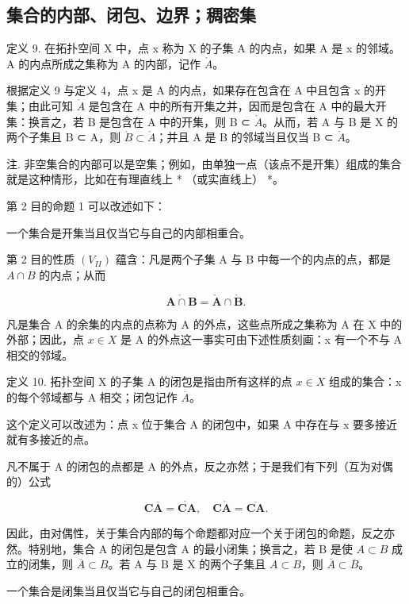 \subsection{集合的内部、闭包、边界；稠密集}

定义 9. 在拓扑空间 X 中，点 x 称为 X 的子集 A 的内点，如果 A 是 x 的邻域。A 的内点所成之集称为 A 的内部，记作 \(\mathring{A}\)。

根据定义 9 与定义 4，点 x 是 A 的内点，如果存在包含在 A 中且包含 x 的开集；由此可知 \(\mathring{A}\) 是包含在 A 中的所有开集之并，因而是包含在 A 中的最大开集：换言之，若 B 是包含在 A 中的开集，则 B ⊂ \(\mathring{A}\)。从而，若 A 与 B 是 X 的两个子集且 B ⊂ A，则 \(\mathring{B} \subset \mathring{A}\)；并且 A 是 B 的邻域当且仅当 B ⊂ \(\mathring{A}\)。

注. 非空集合的内部可以是空集；例如，由单独一点（该点不是开集）组成的集合就是这种情形，比如在有理直线上 * （或实直线上） *。

第 2 目的命题 1 可以改述如下：

一个集合是开集当且仅当它与自己的内部相重合。

第 2 目的性质 \((V_{II})\) 蕴含：凡是两个子集 A 与 B 中每一个的内点的点，都是 \(A \cap B\) 的内点；从而

\[
\mathring {\mathbf {A} \cap \mathbf {B}} = \mathring {\mathbf {A}} \cap \mathring {\mathbf {B}}.\tag{1}
\]

凡是集合 A 的余集的内点的点称为 A 的外点，这些点所成之集称为 A 在 X 中的外部；因此，点 \(x \in X\) 是 A 的外点这一事实可由下述性质刻画：x 有一个不与 A 相交的邻域。

定义 10. 拓扑空间 X 的子集 A 的闭包是指由所有这样的点 \(x \in X\) 组成的集合：x 的每个邻域都与 A 相交；闭包记作 \(\overline{A}\)。

这个定义可以改述为：点 x 位于集合 A 的闭包中，如果 A 中存在与 x 要多接近就有多接近的点。

凡不属于 A 的闭包的点都是 A 的外点，反之亦然；于是我们有下列（互为对偶的）公式

\[
\mathbf {C} \overline {{\mathbf {A}}} = \mathring {\mathbf {C} \mathbf {A}}, \quad \mathbf {C} \mathring {\mathbf {A}} = \overline {{\mathbf {C} \mathbf {A}}}.\tag{2}
\]

因此，由对偶性，关于集合内部的每个命题都对应一个关于闭包的命题，反之亦然。特别地，集合 A 的闭包是包含 A 的最小闭集；换言之，若 B 是使 \(A \subset B\) 成立的闭集，则 \(\overline{A} \subset B\)。若 A 与 B 是 X 的两个子集且 \(A \subset B\)，则 \(\overline{A} \subset \overline{B}\)。

一个集合是闭集当且仅当它与自己的闭包相重合。

